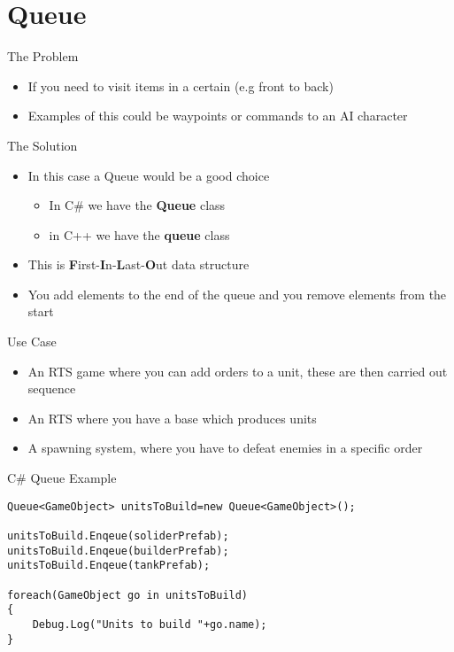\part{Queue}
\frame{\partpage}

\begin{frame}{The Problem}
	\begin{itemize}
		\pause \item If you need to visit items in a certain (e.g front to back)
		\pause \item Examples of this could be waypoints or commands to an AI character 
	\end{itemize}
\end{frame}

\begin{frame}{The Solution}
	\begin{itemize}
		\pause \item In this case a Queue would be a good choice
		\begin{itemize}
			\pause \item In C\# we have the \textbf{Queue} class
			\pause \item in C++ we have the \textbf{queue} class
		\end{itemize}
		\pause \item This is \textbf{F}irst-\textbf{I}n-\textbf{L}ast-\textbf{O}ut data structure
		\pause \item You add elements to the end of the queue and you remove elements from the start
	\end{itemize}
\end{frame}

\begin{frame}{Use Case}
	\begin{itemize}
		\pause \item An RTS game where you can add orders to a unit, these are then carried out sequence
		\pause \item An RTS where you have a base which produces units
		\pause \item A spawning system, where you have to defeat enemies in a specific order
	\end{itemize}
\end{frame}

\begin{frame}[fragile]{C\# Queue
Example}
\begin{lstlisting}
Queue<GameObject> unitsToBuild=new Queue<GameObject>();

unitsToBuild.Enqeue(soliderPrefab);
unitsToBuild.Enqeue(builderPrefab);
unitsToBuild.Enqeue(tankPrefab);

foreach(GameObject go in unitsToBuild)
{
	Debug.Log("Units to build "+go.name);
}

\end{lstlisting}
\end{frame}


